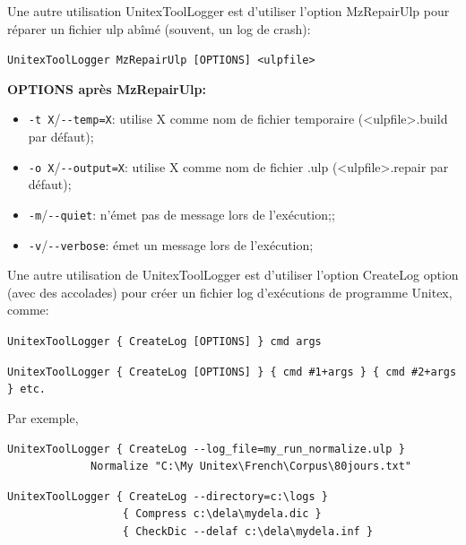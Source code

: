 Une autre utilisation UnitexToolLogger  est d'utiliser l'option MzRepairUlp pour réparer un fichier ulp abîmé (souvent, un log de crash):

\bigskip
\verb+UnitexToolLogger MzRepairUlp [OPTIONS] <ulpfile>+

\bigskip
\noindent \textbf{OPTIONS après MzRepairUlp:}
\begin{itemize}
\item \verb+-t X+/\verb+--temp=X+: utilise  X comme nom de fichier temporaire (<ulpfile>.build par défaut);
\item \verb+-o X+/\verb+--output=X+: utilise X comme nom de fichier .ulp  (<ulpfile>.repair par défaut);
  \item \verb+-m+/\verb+--quiet+: n'émet pas de message lors de l'exécution;;
  \item \verb+-v+/\verb+--verbose+: émet un message lors de l'exécution;
\end{itemize}


Une autre utilisation de UnitexToolLogger est d'utiliser l'option CreateLog option (avec des accolades) pour créer un fichier log d'exécutions de programme Unitex, comme:

\bigskip
\noindent \verb$UnitexToolLogger { CreateLog [OPTIONS] } cmd args$

\bigskip
\noindent \verb$UnitexToolLogger { CreateLog [OPTIONS] } { cmd #1+args } { cmd #2+args } etc.$

\noindent Par exemple,
\begin{verbatim}
UnitexToolLogger { CreateLog --log_file=my_run_normalize.ulp }
             Normalize "C:\My Unitex\French\Corpus\80jours.txt"
\end{verbatim}

\bigskip
\begin{verbatim}
UnitexToolLogger { CreateLog --directory=c:\logs }
                  { Compress c:\dela\mydela.dic }
                  { CheckDic --delaf c:\dela\mydela.inf }
\end{verbatim}

